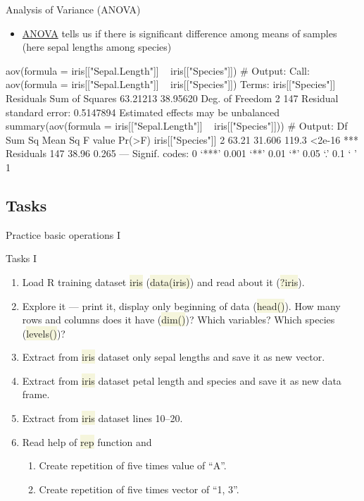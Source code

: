 \documentclass[compress, xelatex, 11pt, xcolor=svgnames, aspectratio=169, url={hyphens, lowtilde}]{beamer}
\renewcommand{\texttt}[1]{\colorbox{Beige}{{\ttfamily #1}}}
\begin{document}
\begin{frame}[fragile]{Analysis of Variance (ANOVA)}
	\begin{itemize}
		\item \href{https://en.wikipedia.org/wiki/Analysis_of_variance}{ANOVA} tells us if there is significant difference among means of samples (here sepal lengths among species)
	\end{itemize}
	\begin{spluscode}
    aov(formula = iris[["Sepal.Length"]] ~ iris[["Species"]]) # Output:
    Call:
       aov(formula = iris[["Sepal.Length"]] ~ iris[["Species"]])
    Terms:
                    iris[["Species"]] Residuals
    Sum of Squares           63.21213  38.95620
    Deg. of Freedom                 2       147
    Residual standard error: 0.5147894
    Estimated effects may be unbalanced
    summary(aov(formula = iris[["Sepal.Length"]] ~ iris[["Species"]])) # Output:
                       Df Sum Sq Mean Sq F value Pr(>F)    
    iris[["Species"]]   2  63.21  31.606   119.3 <2e-16 ***
    Residuals         147  38.96   0.265                   
    ---
    Signif. codes:  0 ‘***’ 0.001 ‘**’ 0.01 ‘*’ 0.05 ‘.’ 0.1 ‘ ’ 1
	\end{spluscode}
\end{frame}

\subsection{Tasks}

\begin{frame}{Practice basic operations I}
	\begin{exampleblock}{Tasks I}
		\begin{enumerate}
			\item Load R training dataset \texttt{iris} (\texttt{data(iris)}) and read about it (\texttt{?iris}).
			\item Explore it --- print it, display only beginning of data (\texttt{head()}). How many rows and columns does it have (\texttt{dim()})? Which variables? Which species (\texttt{levels()})?
			\item Extract from \texttt{iris} dataset only sepal lengths and save it as new vector.
			\item Extract from \texttt{iris} dataset petal length and species and save it as new data frame.
			\item Extract from \texttt{iris} dataset lines 10--20.
			\item Read help of \texttt{rep} function and
			\begin{enumerate}
				\item Create repetition of five times value of \enquote{A}.
				\item Create repetition of five times vector of \enquote{1, 3}.
			\end{enumerate}
		\end{enumerate}
	\end{exampleblock}
\end{frame}
\end{document}
